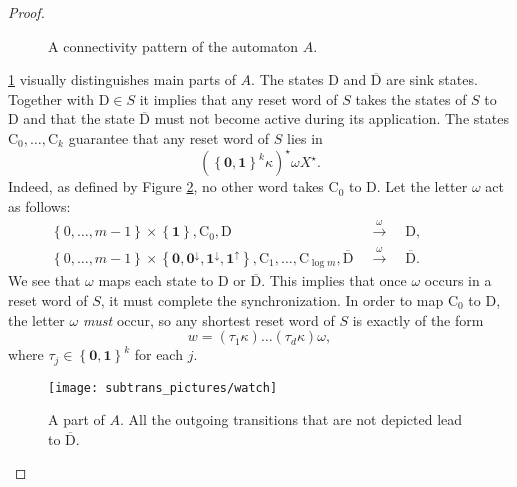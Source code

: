 \documentclass{ws-ijmpc}
\begin{document}
\begin{proof}
\begin{figure}
\caption{A connectivity pattern of the automaton $A$.\label{fig: overall}}
\end{figure}
\ref{fig: overall} visually distinguishes main parts of $A$. The
states $\mathrm{D}$ and $\overline{\mathrm{D}}$ are sink states.
Together with $\mathrm{D}\in S$ it implies that any reset word of
$S$ takes the states of $S$ to $\mathrm{D}$ and that the state
$\overline{\mathrm{D}}$ must not become active during its application.
The states $\mathrm{C}_{0},\dots,\mathrm{C}_{k}$ guarantee that any
reset word of $S$ lies in
\begin{equation}
\left(\left\{ \mathbf{0,1}\right\} ^{k}\kappa\right)^{\star}\omega X^{\star}.\label{eq: rlang}
\end{equation}
Indeed, as defined by Figure \ref{fig: watch}, no other word takes
$\mathrm{C}_{0}$ to $\mathrm{D}$. Let the letter $\omega$ act as
follows:
\begin{eqnarray*}
\left\{ 0,\dots,m-1\right\} \times\left\{ \mathbf{1}\right\} ,\mathrm{C}_{0},\mathrm{D} & \;\;\overset{\omega}{\longrightarrow}\;\; & \mathrm{D},\;\;\;\;\;\;\;\;\;\;\;\;\\
\left\{ 0,\dots,m-1\right\} \times\left\{ \mathbf{0},\mathbf{0^{\downarrow}},\mathbf{1^{\downarrow}},\mathbf{1^{\uparrow}}\right\} ,\mathrm{C}_{1},\dots,\mathrm{C}_{\log m},\overline{\mathrm{D}} & \;\;\overset{\omega}{\longrightarrow}\;\; & \overline{\mathrm{D}}.\;\;\;\;\;\;\;\;\;\;\;\;
\end{eqnarray*}
We see that $\omega$ maps each state to $\mathrm{D}$ or $\overline{\mathrm{D}}$.
This implies that once $\omega$ occurs in a reset word of $S$, it
must complete the synchronization. In order to map $\mathrm{C}_{0}$
to $\mathrm{D}$, the letter $\omega$ \emph{must }occur, so any shortest
reset word of $S$ is exactly of the form
\begin{equation}
w=\left(\tau_{1}\kappa\right)\dots\left(\tau_{d}\kappa\right)\omega,\label{eq: rlang2}
\end{equation}
where $\tau_{j}\in\left\{ \mathbf{0},\mathbf{1}\right\} ^{k}$ for
each $j$.

\begin{figure}
\begin{centering}
\texttt{[image: subtrans\_pictures/watch]}
\par\end{centering}

\caption{\label{fig: watch}A part of $A$. All the outgoing transitions that
are not depicted lead to $\overline{\mathrm{D}}$.}
\end{figure}
 


\end{proof}
\end{document}
